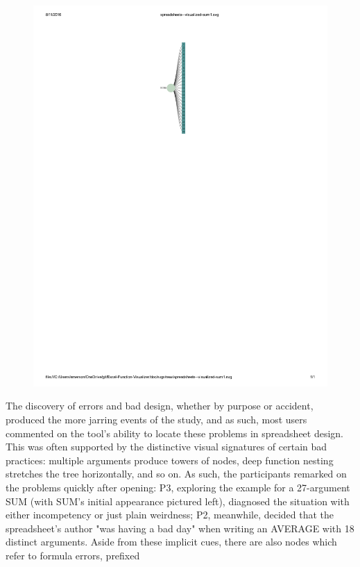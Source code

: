 \documentclass[conference]{IEEEtran}
\begin{document}
	\begin{figure} \centering \includegraphics{SUM}
		\label{"fig:sum"} \end{figure} The discovery of errors and bad design,
	whether by purpose or accident, produced the more jarring events of the study,
	and as such, most users commented on the tool's ability to locate these
	problems in spreadsheet design. This was often supported by the distinctive
	visual signatures of certain bad practices: multiple arguments produce towers
	of nodes, deep function nesting stretches the tree horizontally, and so on. As
	such, the participants remarked on the problems quickly after opening: P3,
	exploring the example for a 27-argument SUM (with SUM's initial appearance
	pictured left), diagnosed the situation with either incompetency or just plain
	weirdness; P2, meanwhile, decided that the spreadsheet's author "was having a
	bad day" when writing an AVERAGE with 18 distinct arguments. Aside from these
	implicit cues, there are also nodes which refer to formula errors, prefixed
\end{document}
